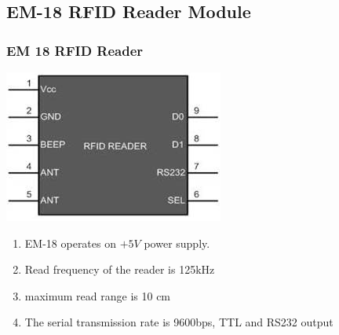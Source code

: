 \documentclass[table,10pt,red]{beamer}	%
\begin{document}
\subsection{EM-18 RFID Reader  Module} %
\begin{frame}
	\frametitle{EM 18 RFID Reader}
	\begin{minipage}[c]{0.2\textwidth}
				\includegraphics[width=\linewidth]{rfidpin}
			\end{minipage}
		\pause
		\hfill
			\begin{minipage}[c]{0.75\textwidth}
				\begin{enumerate}
					\item <+-|alert@+> \small EM-18 operates on $+5V$ power supply. 
					\item <+-|alert@+>Read frequency of the reader is 125kHz
					\item <+-|alert@+>maximum read range is 10 cm
					
					\item <+-|alert@+> The serial transmission rate is 9600bps, TTL and RS232 output
				
					
				\end{enumerate}
			\end{minipage}   

\end{frame}
\end{document}
